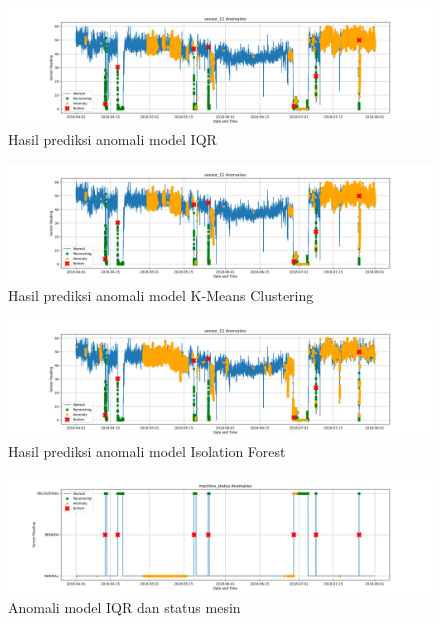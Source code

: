 \documentclass[12pt, a4paper, onecolumn, oneside, final]{report}
\begin{document}
    \begin{figure}[h]
        \centerline{\includegraphics[width=1.4\textwidth]{resources/Acuan/IQR_sensor_11.png}}
        \caption{Hasil prediksi anomali model IQR} \label{IQR11}
    \end{figure}
    \begin{figure}[h]
        \centerline{\includegraphics[width=1.4\textwidth]{resources/Acuan/KMeans_sensor_11.png}}
        \caption{Hasil prediksi anomali model K-Means Clustering} \label{KM11}
    \end{figure}
    \begin{figure}[h]
        \centerline{\includegraphics[width=1.4\textwidth]{resources/Acuan/IsoFor_sensor_11.png}}
        \caption{Hasil prediksi anomali model Isolation Forest} \label{IF11}
    \end{figure}
    \begin{figure}[h]
        \centerline{\includegraphics[width=1.4\textwidth]{resources/Acuan/IQR_machine_status.png}}
        \caption{Anomali model IQR dan status mesin} \label{IQRms}
    \end{figure}
\end{document}
